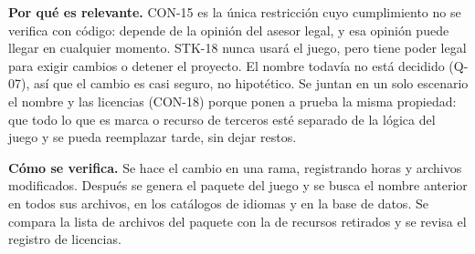 \textbf{Por qué es relevante.} CON-15 es la única restricción cuyo cumplimiento no se verifica con código: depende de la opinión del asesor legal, y esa opinión puede llegar en cualquier momento. STK-18 nunca usará el juego, pero tiene poder legal para exigir cambios o detener el proyecto. El nombre todavía no está decidido (Q-07), así que el cambio es casi seguro, no hipotético. Se juntan en un solo escenario el nombre y las licencias (CON-18) porque ponen a prueba la misma propiedad: que todo lo que es marca o recurso de terceros esté separado de la lógica del juego y se pueda reemplazar tarde, sin dejar restos.

\textbf{Cómo se verifica.} Se hace el cambio en una rama, registrando horas y archivos modificados. Después se genera el paquete del juego y se busca el nombre anterior en todos sus archivos, en los catálogos de idiomas y en la base de datos. Se compara la lista de archivos del paquete con la de recursos retirados y se revisa el registro de licencias.
